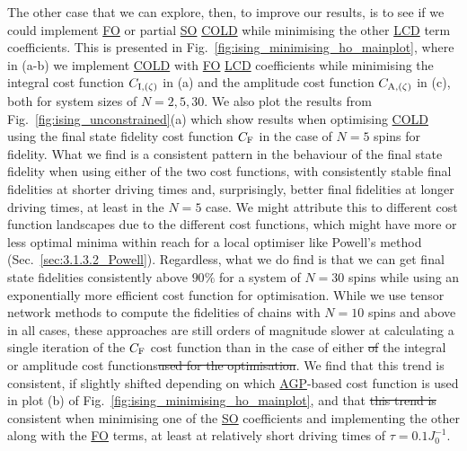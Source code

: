 \documentclass[a4paper,oneside,11pt]{book}
\newcommand{\acrref}[1]{\hyperref[acr:#1]{#1}}
\providecommand{\DIFaddtex}[1]{{\protect\color{blue}\uwave{#1}}} %
\providecommand{\DIFdeltex}[1]{{\protect\color{red}\sout{#1}}}                      %
\providecommand{\DIFaddbegin}{} %
\providecommand{\DIFaddend}{} %
\providecommand{\DIFdelbegin}{} %
\providecommand{\DIFdelend}{} %
\providecommand{\DIFadd}[1]{\texorpdfstring{\DIFaddtex{#1}}{#1}} %
\providecommand{\DIFdel}[1]{\texorpdfstring{\DIFdeltex{#1}}{}} %
\newcommand{\DIFscaledelfig}{0.5}
\newlength{\DIFdelgraphicswidth} %
\newlength{\DIFdelgraphicsheight} %
\newcommand{\DIFaddincludegraphics}[2][]{{\color{blue}\fbox{\DIFOincludegraphics[#1]{#2}}}} %
\newcommand{\DIFdelincludegraphics}[2][]{%
\sbox{\DIFdelgraphicsbox}{\DIFOincludegraphics[#1]{#2}}%
\settoboxwidth{\DIFdelgraphicswidth}{\DIFdelgraphicsbox} %
\settoboxtotalheight{\DIFdelgraphicsheight}{\DIFdelgraphicsbox} %
\scalebox{\DIFscaledelfig}{%
\parbox[b]{\DIFdelgraphicswidth}{\usebox{\DIFdelgraphicsbox}\\[-\baselineskip] \rule{\DIFdelgraphicswidth}{0em}}\llap{\resizebox{\DIFdelgraphicswidth}{\DIFdelgraphicsheight}{%
\setlength{\unitlength}{\DIFdelgraphicswidth}%
\begin{picture}(1,1)%
\thicklines\linethickness{2pt} %
{\color[rgb]{1,0,0}\put(0,0){\framebox(1,1){}}}%
{\color[rgb]{1,0,0}\put(0,0){\line( 1,1){1}}}%
{\color[rgb]{1,0,0}\put(0,1){\line(1,-1){1}}}%
\end{picture}%
}\hspace*{3pt}}} %
} %
\DeclareRobustCommand{\DIFaddbegin}{\DIFOaddbegin \let\includegraphics\DIFaddincludegraphics} %
\DeclareRobustCommand{\DIFaddend}{\DIFOaddend \let\includegraphics\DIFOincludegraphics} %
\DeclareRobustCommand{\DIFdelbegin}{\DIFOdelbegin \let\includegraphics\DIFdelincludegraphics} %
\DeclareRobustCommand{\DIFdelend}{\DIFOaddend \let\includegraphics\DIFOincludegraphics} %
\begin{document}
The other case that we can explore, then, to improve our results, is to see if we could implement \acrref{FO} or partial \acrref{SO} \acrref{COLD} while minimising the other \acrref{LCD} term coefficients. This is presented in Fig.~\ref{fig:ising_minimising_ho_mainplot}, where in (a-b) we implement \acrref{COLD} with \acrref{FO} \acrref{LCD} coefficients while minimising the integral cost function $C_{\rm I, (\zeta)}$ in (a) and the amplitude cost function $C_{\rm A, (\zeta)}$ in (c), both for system sizes of $N = 2, 5, 30$. We also plot the results from Fig.~\ref{fig:ising_unconstrained}(a) which show results when optimising \acrref{COLD} using the final state fidelity cost function $C_{\rm F}$ in the case of $N = 5$ spins for fidelity. What we find is a consistent pattern in the behaviour of the final state fidelity when using either of the two cost functions, with consistently stable final fidelities at shorter driving times and, surprisingly, better final fidelities at longer driving times, at least in the $N=5$ case. We might attribute this to different cost function landscapes due to the different cost functions, which might have more or less optimal minima within reach for a local optimiser like Powell's method (Sec.~\ref{sec:3.1.3.2_Powell}). Regardless, what we do find is that we can get final state fidelities consistently above $90\%$ for a system of $N=30$ spins while using an exponentially more efficient cost function for optimisation. While we use tensor network methods to compute the fidelities of chains with $N=10$ spins and above in all cases, these approaches are still orders of magnitude slower at calculating a single iteration of the $C_{\rm F}$ cost function than in the case of either \DIFdelbegin \DIFdel{of }\DIFdelend the integral or amplitude cost functions\DIFdelbegin \DIFdel{used for the optimisation}\DIFdelend . We find that this trend is consistent, if slightly shifted depending on which \acrref{AGP}-based cost function is used in plot (b) of Fig.~\ref{fig:ising_minimising_ho_mainplot}, and that \DIFdelbegin \DIFdel{this trend is }\DIFdelend \DIFaddbegin \DIFadd{it is also }\DIFaddend consistent when minimising one of the \acrref{SO} coefficients and implementing the other along with the \acrref{FO} terms, at least at relatively short driving times of $\tau = 0.1J_0^{-1}$.
\end{document}
